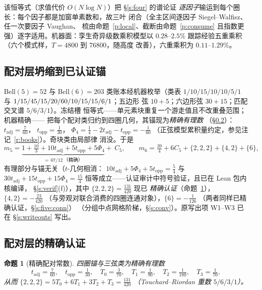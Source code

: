 \documentclass[11pt]{article}
\numberwithin{equation}{section}
\newtheorem{proposition}[theorem]{命题}
\theoremstyle{definition}
\theoremstyle{remark}
\begin{document}
该恒等式（求值代价 $O(N\log N)$）把 \S\ref{s:four} 的谱论证
\emph{逐因子}输运到每个圈长：每个因子都是加窗单素数和，故三叶
闭合（全主区间逐因子 Siegel--Walfisz、任一次要因子 Vaughan、
梳由命题~\ref{p:local}、截断由命题~\ref{p:consume} 且指数更
强）逐字适用。机器面：孪生奇异级数乘积模型以 $0.28$--$2.5\%$
跟踪经验五重乘积（六个模式样，$T=4800$ 到 $76800$，随高度
改善），六重乘积为 $0.11$--$1.29\%$。

\subsection{配对层坍缩到已认证锚}

Bell$(5)=52$ 与 Bell$(6)=203$ 类账本经机器枚举（类表
$1/10/15/10/10/5/1$ 与 $1/15/45/15/ \\ 
20/60/10/15/15/6/1$；五边形
弦 $10+5$；六边形弦 $30+15$；匹配交叉谱 $5/6/3/1$）。冻结槽
恒等式——单元素块重复一个游走值且不改重叠范围；机器精确——
把每个配对类归约到四圈几何，其锚现为\emph{精确有理数}
（\S\ref{s:five:cert}）：$t_{\mathrm{adj}}=\tfrac7{60}$，
$t_{\mathrm{opp}}=\tfrac1{30}$，
$\Phi_4=\tfrac14-2t_{\mathrm{adj}}-t_{\mathrm{opp}}=-\tfrac1{60}$
（正弦模型累积量约定，参见注记~\ref{r:books}）。奇块类由局部律
消没。于是
\[
m_5=\underbrace{1+\tfrac{10}3+10t_{\mathrm{adj}}
+5t_{\mathrm{opp}}+5\Phi_4}_{=\,67/12\ \text{（精确）}}+\ C_5,
\qquad
m_6=\tfrac{39}4+6C_5+\{2,2,2\}+\{4,2\}+\{6\},
\]
有理部分与锚无关（$t$-几何相消：
$10t_{\mathrm{adj}}+5\Phi_4+5t_{\mathrm{opp}}=\tfrac54$ 与
$30t_{\mathrm{adj}}+15t_{\mathrm{opp}}+15\Phi_4=\tfrac{15}4$
恒等成立——认证审计中符号验证，且已在 Lean 包内核编译，
\S\ref{s:verif}(f)），其中 $\{2,2,2\}=\tfrac{131}{420}$ 现已
\emph{精确认证}（命题~\ref{p:t222}），$\{4,2\}=-\tfrac{23}{420}$
（与旁观对联合消费的四圈连通对象），$\{6\}=-\tfrac1{126}$
（两者同样已精确认证，\S\ref{s:five:conn}）
（分组中点网格阶梯，\S\ref{s:conv}）。原写出项 W1--W3 已在
\S\ref{s:writeouts} 写出。

\subsection{配对层的精确认证}\label{s:five:cert}

\begin{proposition}[精确配对常数]\label{p:t222}
四圈锚与三弦类为精确有理数
\[
t_{\mathrm{adj}}=\tfrac7{60},\quad
t_{\mathrm{opp}}=\tfrac1{30},\quad
T_0=\tfrac3{70},\quad T_1=\tfrac1{90},\quad
T_2=\tfrac1{180},\quad T_3=\tfrac1{70},
\]
从而 $\{2,2,2\}=5T_0+6T_1+3T_2+T_3=\tfrac{131}{420}$
（Touchard--Riordan 重数 $5/6/3/1$）。
\end{proposition}
\end{document}
